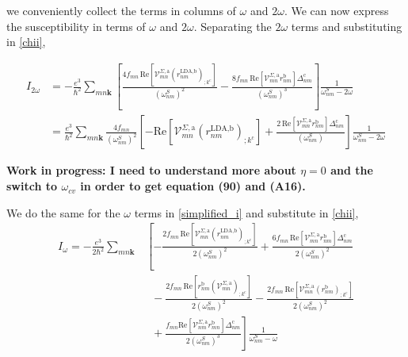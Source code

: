 \documentclass[11pt]{article}
\begin{document}
we conveniently collect the terms in columns of $\omega$ and $2\omega$. We can now express the susceptibility in terms of $\omega$ and $2\omega$. Separating the $2\omega$ terms and substituting in  \eqref{chii}, %

\begin{align}\label{2wchii}
I_{2\omega}
&= -\frac{e^3}{\hbar^2}\sum_{mn\mathbf{k}}\left[\frac{4f_{mn}\,\mathrm{Re}\left[\mathcal{V}^{\Sigma,\text{a}}_{mn}\left(r^{\text{LDA},\text{b}}_{nm}\right)_{;k^{\text{c}}}\right]}{(\omega^{S}_{nm})^{2}} - \frac{8f_{mn}\,\mathrm{Re}\left[\mathcal{V}^{\Sigma,\text{a}}_{mn}r^{\text{b}}_{nm}\right]\Delta^{\text{c}}_{nm}}{(\omega^{S}_{nm})^{3}}\right]\frac{1}{\omega^{S}_{nm}-2\omega}\nonumber\\
&= \frac{e^3}{\hbar^2}\sum_{mn\mathbf{k}}\frac{4f_{mn}}{(\omega^{S}_{nm})^{2}}\left[-\mathrm{Re}\left[\mathcal{V}^{\Sigma,\text{a}}_{mn}\left(r^{\text{LDA},\text{b}}_{nm}\right)_{;k^{\text{c}}}\right] + \frac{2\,\mathrm{Re}\left[\mathcal{V}^{\Sigma,\text{a}}_{mn}r^{\text{b}}_{nm}\right]\Delta^{\text{c}}_{nm}}{(\omega^{S}_{nm})}\right]\frac{1}{\omega^{S}_{nm}-2\omega}
\end{align}

\textbf{Work in progress: I need to understand more about $\eta = 0$ and the switch to $\omega_{cv}$ in order to get equation (90) and (A16).}

We do the same for the $\omega$ terms in \eqref{simplified_i} and substitute in \eqref{chii},
\begin{align}\label{wchii}
I_{\omega}
= -\frac{e^3}{2\hbar^2}\sum_{mn\mathbf{k}}
&\left[
-\frac{2f_{mn}\,\mathrm{Re}\left[\mathcal{V}^{\Sigma,\text{a}}_{mn}\left(r^{\text{LDA},\text{b}}_{nm}\right)_{;k^{\text{c}}}\right]}{2(\omega^{S}_{nm})^{2}}
+ \frac{6f_{mn}\,\mathrm{Re}\left[\mathcal{V}^{\Sigma,\text{a}}_{mn}r^{\text{b}}_{nm}\right]\Delta^{\text{c}}_{nm}}{2(\omega^{S}_{nm})^{2}}\right.\nonumber\\
&\,\,\,- \left.\frac{2f_{mn}\,\mathrm{Re}\left[r^{\text{b}}_{nm}\left(\mathcal{V}^{\Sigma,\text{a}}_{mn}\right)_{;k^{\text{c}}}\right]}{2(\omega^{S}_{nm})^{2}}
- \frac{2f_{mn}\,\mathrm{Re}\left[\mathcal{V}^{\Sigma,\text{a}}_{mn}\left(r^{\text{b}}_{nm}\right)_{;k^{\text{c}}}\right]}{2(\omega^{S}_{nm})^{2}}\right.\nonumber\\
&\,\,\,+ \left.\frac{f_{mn}\mathrm{Re}\left[\mathcal{V}^{\Sigma,\text{a}}_{nm}r^{\text{b}}_{mn}\right]\Delta_{nm}^{\text{c}}}{2(\omega^{S}_{nm})^{3}}
\right]\frac{1}{\omega^{S}_{nm}-\omega}
\end{align}
\end{document}
